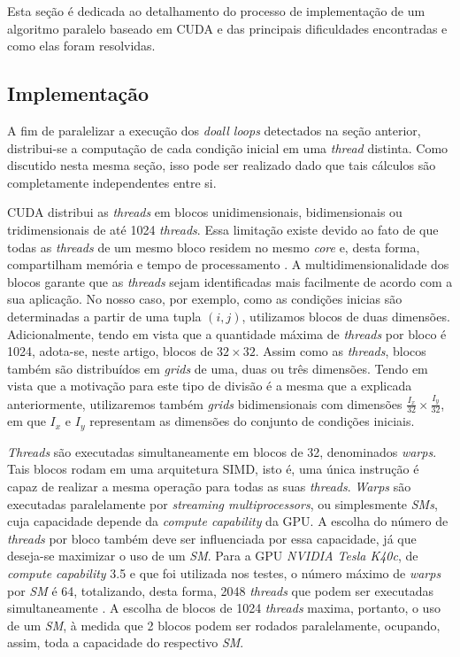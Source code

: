 \documentclass[12pt]{article}
\begin{document}
Esta seção é dedicada ao detalhamento do processo de implementação de um
algoritmo paralelo baseado em CUDA e das principais dificuldades encontradas e
como elas foram resolvidas.

\subsection{Implementação}

A fim de paralelizar a execução dos \textit{doall loops} detectados na seção
anterior, distribui-se a computação de cada condição inicial em uma
\textit{thread} distinta. Como discutido nesta mesma seção, isso pode ser
realizado dado que tais cálculos são completamente independentes entre si.

CUDA distribui as \textit{threads} em blocos unidimensionais, bidimensionais ou
tridimensionais de até 1024 \textit{threads}. Essa limitação existe devido ao
fato de que todas as \textit{threads} de um mesmo bloco residem no mesmo
\textit{core} e, desta forma, compartilham memória e tempo de processamento
\cite{cuda}. A multidimensionalidade dos blocos garante que as \textit{threads}
sejam identificadas mais facilmente de acordo com a sua aplicação. No nosso
caso, por exemplo, como as condições inicias são determinadas a partir de uma
tupla \((i,j)\), utilizamos blocos de duas dimensões. Adicionalmente, tendo em
vista que a quantidade máxima de \textit{threads} por bloco é 1024, adota-se,
neste artigo, blocos de \(32\times32\). Assim como as \textit{threads}, blocos
também são distribuídos em \textit{grids} de uma, duas ou três dimensões. Tendo
em vista que a motivação para este tipo de divisão é a mesma que a explicada
anteriormente, utilizaremos também \textit{grids} bidimensionais com dimensões
\(\frac{I_x}{32}\times\frac{I_y}{32}\), em que \(I_x\) e \(I_y\) representam as
dimensões do conjunto de condições iniciais.

\textit{Threads} são executadas simultaneamente em blocos de 32, denominados
\textit{warps}. Tais blocos rodam em uma arquitetura SIMD, isto é, uma única
instrução é capaz de realizar a mesma operação para todas as suas
\textit{threads}. \textit{Warps} são executadas paralelamente por
\textit{streaming multiprocessors}, ou simplesmente \textit{SMs}, cuja
capacidade depende da \textit{compute capability} da GPU. A escolha do número de
\textit{threads} por bloco também deve ser influenciada por essa capacidade, já
que deseja-se maximizar o uso de um \textit{SM}. Para a GPU \textit{NVIDIA Tesla
K40c}, de \textit{compute capability} 3.5 e que foi utilizada nos testes, o
número máximo de \textit{warps} por \textit{SM} é 64, totalizando, desta forma,
2048 \textit{threads} que podem ser executadas simultaneamente \cite{compute}. A
escolha de blocos de 1024 \textit{threads} maxima, portanto, o uso de um
\textit{SM}, à medida que 2 blocos podem ser rodados paralelamente, ocupando,
assim, toda a capacidade do respectivo \textit{SM}.
\end{document}
